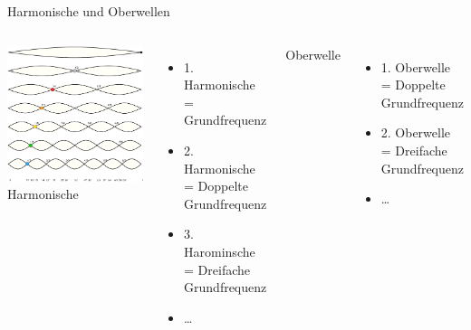 \begin{frame}{Harmonische und Oberwellen}
  \begin{columns}[c]
      \includegraphics[width=\textwidth,height=\textheight,keepaspectratio]{a11/Moodswingerscale.pdf}
      {\tiny \hyperlink{refs}{\cite{wm}}}
      Harmonische
      \begin{itemize}
    \item 1. Harmonische = Grundfrequenz
    \item 2. Harmonische = Doppelte Grundfrequenz
    \item 3. Harominsche = Dreifache Grundfrequenz
    \item \ldots
      \end{itemize}
      Oberwelle
      \begin{itemize}
    \item 1. Oberwelle = Doppelte Grundfrequenz
    \item 2. Oberwelle = Dreifache Grundfrequenz
    \item \ldots
      \end{itemize}
  \end{columns}
\end{frame}


